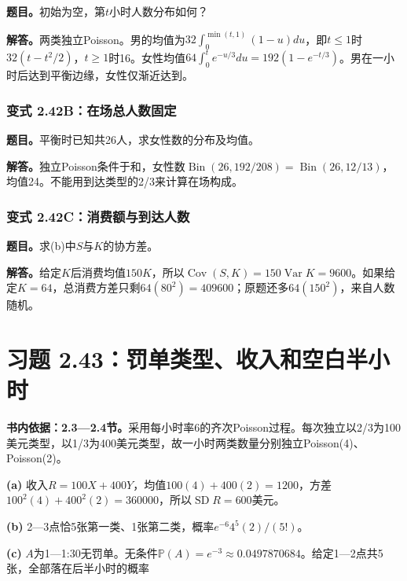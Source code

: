 \documentclass[12pt,a4paper,UTF8,fontset=fandol]{ctexart}
\begin{document}
\textbf{题目。}初始为空，第\(t\)小时人数分布如何？

\textbf{解答。}两类独立Poisson。男的均值为\(32\int_0^{\min(t,1)}(1-u)du\)，即\(t\le1\)时\(32(t-t^2/2)\)，\(t\ge1\)时16。女性均值\(64\int_0^t e^{-u/3}du=192(1-e^{-t/3})\)。男在一小时后达到平衡边缘，女性仅渐近达到。

\subsubsection{变式
2.42B：在场总人数固定}\label{ux53d8ux5f0f-2.42bux5728ux573aux603bux4ebaux6570ux56faux5b9a}

\textbf{题目。}平衡时已知共26人，求女性数的分布及均值。

\textbf{解答。}独立Poisson条件于和，女性数\(\operatorname{Bin}(26,192/208)=\operatorname{Bin}(26,12/13)\)，均值24。不能用到达类型的2/3来计算在场构成。

\subsubsection{变式
2.42C：消费额与到达人数}\label{ux53d8ux5f0f-2.42cux6d88ux8d39ux989dux4e0eux5230ux8fbeux4ebaux6570}

\textbf{题目。}求(b)中\(S\)与\(K\)的协方差。

\textbf{解答。}给定\(K\)后消费均值\(150K\)，所以\(\operatorname{Cov}(S,K)=150\operatorname{Var}K=9600\)。如果给定\(K=64\)，总消费方差只剩\(64(80^2)=409600\)；原题还多\(64(150^2)\)，来自人数随机。

\section{习题
2.43：罚单类型、收入和空白半小时}\label{ux4e60ux9898-2.43ux7f5aux5355ux7c7bux578bux6536ux5165ux548cux7a7aux767dux534aux5c0fux65f6}

\textbf{书内依据：2.3---2.4节。}采用每小时率6的齐次Poisson过程。每次独立以2/3为100美元类型，以1/3为400美元类型，故一小时两类数量分别独立Poisson(4)、Poisson(2)。

\textbf{(a)}
收入\(R=100X+400Y\)，均值\(100(4)+400(2)=1200\)，方差\(100^2(4)+400^2(2)=360000\)，所以\(\boxed{\operatorname{SD}R=600}\)美元。

\textbf{(b)}
2---3点恰5张第一类、1张第二类，概率\(\boxed{e^{-6}4^5(2)/(5!)}\)。

\textbf{(c)}
\(A\)为1---1:30无罚单。无条件\(\mathbb P(A)=e^{-3}\approx0.0497870684\)。给定1---2点共5张，全部落在后半小时的概率
\end{document}
